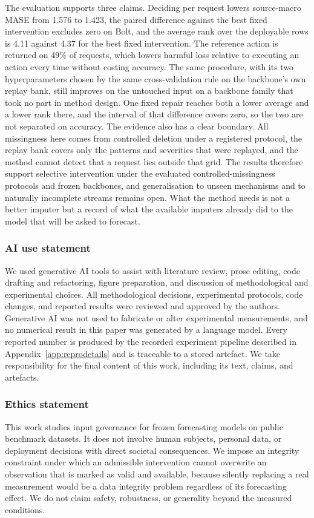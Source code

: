 \documentclass{article}
\begin{document}
The evaluation supports three claims. Deciding per request lowers source-macro MASE from 1.576 to 1.423, the paired difference against the best fixed intervention excludes zero on Bolt, and the average rank over the deployable rows is 4.11 against 4.37 for the best fixed intervention. The reference action is returned on 49\% of requests, which lowers harmful loss relative to executing an action every time without costing accuracy. The same procedure, with its two hyperparameters chosen by the same cross-validation rule on the backbone's own replay bank, still improves on the untouched input on a backbone family that took no part in method design. One fixed repair reaches both a lower average and a lower rank there, and the interval of that difference covers zero, so the two are not separated on accuracy.
The evidence also has a clear boundary. All missingness here comes from controlled deletion
under a registered protocol, the replay bank covers only the patterns and severities that were
replayed, and the method cannot detect that a request lies outside that grid. The results
therefore support selective intervention under the evaluated controlled-missingness protocols
and frozen backbones, and generalisation to unseen mechanisms and to naturally incomplete
streams remains open. What the method needs is not a better imputer but a record of what the available imputers already did to the model that will be asked to forecast.

\subsubsection*{AI use statement}
We used generative AI tools to assist with literature review, prose editing, code drafting and
refactoring, figure preparation, and discussion of methodological and experimental choices.
All methodological decisions, experimental protocols, code changes, and reported results were
reviewed and approved by the authors. Generative AI was not used to fabricate or alter
experimental measurements, and no numerical result in this paper was generated by a language
model. Every reported number is produced by the recorded experiment pipeline described in
Appendix~\ref{app:reprodetails} and is traceable to a stored artefact. We take responsibility
for the final content of this work, including its text, claims, and artefacts.

\subsubsection*{Ethics statement}
This work studies input governance for frozen forecasting models on public benchmark datasets.
It does not involve human subjects, personal data, or deployment decisions with direct
societal consequences. We impose an integrity constraint under which an admissible
intervention cannot overwrite an observation that is marked as valid and available, because
silently replacing a real measurement would be a data integrity problem regardless of its
forecasting effect. We do not claim safety, robustness, or generality beyond the measured
conditions.
\end{document}
